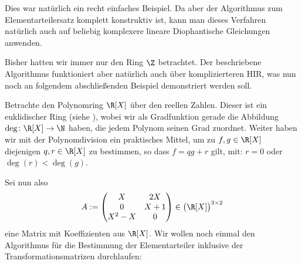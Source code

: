 Dies war natürlich ein recht einfaches Beispiel. Da aber der Algorithmus zum
Elementarteilersatz komplett konstruktiv ist, kann man dieses Verfahren
natürlich auch auf beliebig komplexere lineare Diophantische Gleichungen
anwenden.

Bisher hatten wir immer nur den Ring $\Z$ betrachtet. Der beschriebene
Algorithmus funktioniert aber natürlich auch über komplizierteren HIR, was nun
noch an folgendem abschließenden Beispiel demonstriert werden soll.

\begin{thBeisp}
    Betrachte den Polynomring $\R[X]$ über den reellen Zahlen. Dieser ist ein
    euklidischer Ring (siehe \cite[??]{talk:rief}),
    wobei wir als Gradfunktion gerade die Abbildung $\deg\colon\R[X]\to\N$
    haben, die jedem Polynom seinen Grad zuordnet. Weiter haben wir mit der
    Polynomdivision ein praktisches Mittel, um zu $f,g\in\R[X]$ diejenigen
    $q,r\in\R[X]$ zu bestimmen, so dass $f = qg+r$ gilt, mit: $r=0$ oder
    $\deg(r)<\deg(g)$.
    
    Sei nun also
    \[ A := \Matrix{ X      &  2X   \\
                     0      &  X+1  \\
                     X^2-X  &  0     }  
    \in \bigl(\R[X]\bigr)^{3\times2}
    \]
    eine Matrix mit Koeffizienten aus $\R[X]$. Wir wollen noch einmal den
    Algorithmus für die Bestimmung der Elementarteiler inklusive der
    Transformationsmatrizen durchlaufen:
    

\end{thBeisp}
